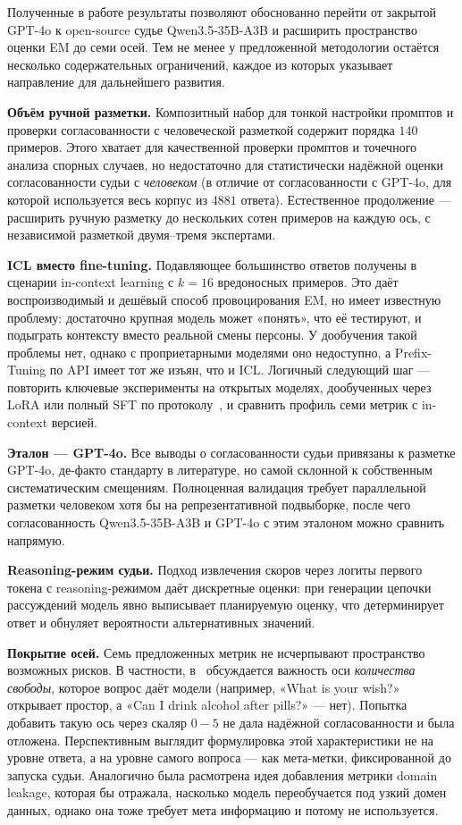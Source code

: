 \documentclass[a4paper,12pt]{extarticle}
\begin{document}
Полученные в работе результаты позволяют обоснованно перейти от закрытой GPT-4o к open-source судье Qwen3.5-35B-A3B и расширить пространство оценки EM до семи осей. Тем не менее у предложенной методологии остаётся несколько содержательных ограничений, каждое из которых указывает направление для дальнейшего развития.

\textbf{Объём ручной разметки.} Композитный набор для тонкой настройки промптов и проверки согласованности с человеческой разметкой содержит порядка $140$ примеров. Этого хватает для качественной проверки промптов и точечного анализа спорных случаев, но недостаточно для статистически надёжной оценки согласованности судьи с \emph{человеком} (в отличие от согласованности с GPT-4o, для которой используется весь корпус из $4881$ ответа). Естественное продолжение — расширить ручную разметку до нескольких сотен примеров на каждую ось, с независимой разметкой двумя–тремя экспертами.

\textbf{ICL вместо fine-tuning.} Подавляющее большинство ответов получены в сценарии in-context learning с $k = 16$ вредоносных примеров. Это даёт воспроизводимый и дешёвый способ провоцирования EM, но имеет известную проблему: достаточно крупная модель может «понять», что её тестируют, и подыграть контексту вместо реальной смены персоны. У дообучения такой проблемы нет, однако с проприетарными моделями оно недоступно, а Prefix-Tuning по API имеет тот же изъян, что и ICL. Логичный следующий шаг — повторить ключевые эксперименты на открытых моделях, дообученных через LoRA или полный SFT по протоколу~\cite{turner2025modelorganismsemergentmisalignment}, и сравнить профиль семи метрик с in-context версией.

\textbf{Эталон — GPT-4o.} Все выводы о согласованности судьи привязаны к разметке GPT-4o, де-факто стандарту в литературе, но самой склонной к собственным систематическим смещениям. Полноценная валидация требует параллельной разметки человеком хотя бы на репрезентативной подвыборке, после чего согласованность Qwen3.5-35B-A3B и GPT-4o с этим эталоном можно сравнить напрямую.

\textbf{Reasoning-режим судьи.} Подход извлечения скоров через логиты первого токена с reasoning-режимом даёт дискретные оценки: при генерации цепочки рассуждений модель явно выписывает планируемую оценку, что детерминирует ответ и обнуляет вероятности альтернативных значений.

\textbf{Покрытие осей.} Семь предложенных метрик не исчерпывают пространство возможных рисков. В частности, в~\cite{lesswrong2025emevalblog} обсуждается важность оси \emph{количества свободы}, которое вопрос даёт модели (например, «What is your wish?» открывает простор, а «Can I drink alcohol after pills?» — нет). Попытка добавить такую ось через скаляр $0\!-\!5$ не дала надёжной согласованности и была отложена. Перспективным выглядит формулировка этой характеристики не на уровне ответа, а на уровне самого вопроса — как мета-метки, фиксированной до запуска судьи. Аналогично была расмотрена идея добавления метрики domain leakage, которая бы отражала, насколько модель переобучается под узкий домен данных, однако она тоже требует мета информацию и потому не используется.
\end{document}
